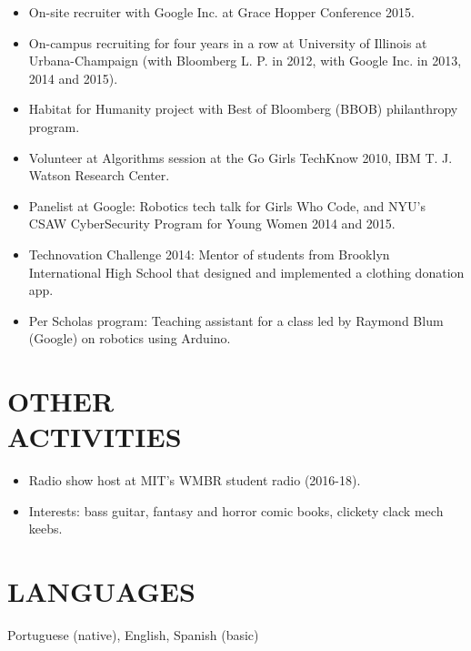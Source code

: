 \documentclass[line,margin]{res}
\begin{document}
\begin{resume}
\begin{itemize}
              \item On-site recruiter with Google Inc. at Grace Hopper Conference 2015.
	      \item On-campus recruiting for four years in a row at University of Illinois at Urbana-Champaign (with Bloomberg L. P. in 2012, with Google Inc. in 2013, 2014 and 2015).
	      \item Habitat for Humanity project with Best of Bloomberg (BBOB) philanthropy program.
	      \item Volunteer at Algorithms session at the Go Girls TechKnow 2010, IBM T. J. Watson Research Center.
	      \item Panelist at Google: Robotics tech talk for Girls Who Code, and NYU's 
	      CSAW CyberSecurity Program for Young Women 2014 and 2015.
	      \item Technovation Challenge 2014: Mentor of students from Brooklyn International High School that designed and implemented a clothing donation app.
	      \item Per Scholas program: Teaching assistant for a class led by Raymond Blum (Google) on robotics using Arduino.
               \end{itemize}

\section{OTHER \\ ACTIVITIES}            \begin{itemize}  \itemsep -2pt
  \item Radio show host at MIT's WMBR student radio (2016-18).
            \item Interests: bass guitar, fantasy and horror comic books, clickety clack mech keebs.
            \end{itemize}

\section{LANGUAGES}
Portuguese (native), English, Spanish (basic)

\end{resume}
\end{document}
